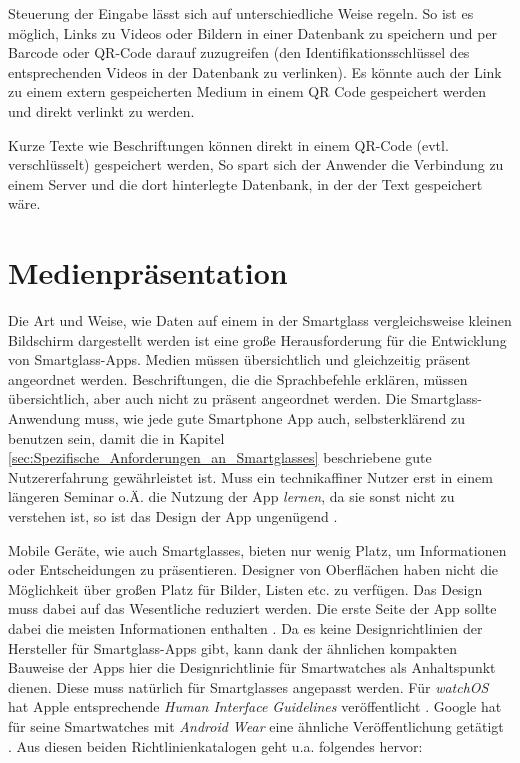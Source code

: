 Steuerung der Eingabe lässt sich auf unterschiedliche Weise regeln. So ist es möglich, Links zu Videos oder Bildern in einer Datenbank zu speichern und per Barcode oder QR-Code darauf zuzugreifen (den Identifikationsschlüssel des entsprechenden Videos in der Datenbank zu verlinken). Es könnte auch der Link zu einem extern gespeicherten Medium in einem QR Code gespeichert werden und direkt verlinkt zu werden. 

Kurze Texte wie Beschriftungen können direkt in einem QR-Code (evtl. verschlüsselt) gespeichert werden, So spart sich der Anwender die Verbindung zu einem Server und die dort hinterlegte Datenbank, in der der Text gespeichert wäre.
%
%
%
%
%
%
\section{Medienpräsentation}
\label{sec:Medienpraesentation}
Die Art und Weise, wie Daten auf einem in der Smartglass vergleichsweise kleinen Bildschirm dargestellt werden ist eine große Herausforderung für die Entwicklung von Smartglass-Apps. Medien müssen übersichtlich und gleichzeitig präsent angeordnet werden. Beschriftungen, die die Sprachbefehle erklären, müssen übersichtlich, aber auch nicht zu präsent angeordnet werden. Die Smartglass- Anwendung muss, wie jede gute Smartphone App auch, selbsterklärend zu benutzen sein, damit die in Kapitel \ref{sec:Spezifische_Anforderungen_an_Smartglasses} beschriebene gute Nutzererfahrung gewährleistet ist. 
Muss ein technikaffiner Nutzer erst in einem längeren Seminar o.Ä. die Nutzung der App \emph{lernen}, da sie sonst nicht zu verstehen ist, so ist das Design der App ungenügend \cite{Hoober2011} \cite[S.~141ff]{Norman2013}.

Mobile Geräte, wie auch Smartglasses, bieten nur wenig Platz, um Informationen oder Entscheidungen zu präsentieren. Designer von Oberflächen haben nicht die Möglichkeit über großen Platz für Bilder, Listen etc. zu verfügen. Das Design muss dabei auf das Wesentliche reduziert werden. Die erste Seite der App sollte dabei die meisten Informationen enthalten \cite[S.~442]{Tidwell2005}. Da es keine Designrichtlinien der Hersteller für Smartglass-Apps gibt, kann dank der ähnlichen kompakten Bauweise der Apps hier die Designrichtlinie für Smartwatches als Anhaltspunkt dienen. Diese muss natürlich für Smartglasses angepasst werden.
Für \emph{watchOS} hat Apple entsprechende \emph{Human Interface Guidelines} veröffentlicht 
\cite{Apple2018c}. Google hat für seine Smartwatches mit \emph{Android Wear} eine ähnliche Veröffentlichung getätigt \cite{Google2018}. Aus diesen beiden Richtlinienkatalogen geht u.a. folgendes hervor:

